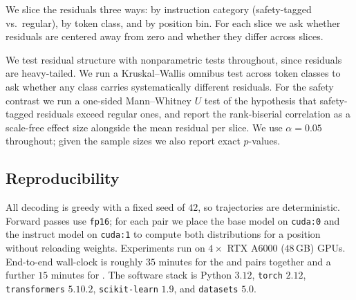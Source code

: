  We slice the residuals three ways: by instruction category (safety-tagged vs.\ regular), by token class, and by position bin. For each slice we ask whether residuals are centered away from zero and whether they differ across slices.

 We test residual structure with nonparametric tests throughout, since residuals are heavy-tailed. We run a Kruskal--Wallis omnibus test across token classes to ask whether any class carries systematically different residuals. For the safety contrast we run a one-sided Mann--Whitney $U$ test of the hypothesis that safety-tagged residuals exceed regular ones, and report the rank-biserial correlation as a scale-free effect size alongside the mean residual per slice. We use $\alpha=0.05$ throughout; given the sample sizes we also report exact $p$-values.

\subsection{Reproducibility}\label{ssec:repro}

All decoding is greedy with a fixed seed of $42$, so trajectories are deterministic. Forward passes use \texttt{fp16}; for each pair we place the base model on \texttt{cuda:0} and the instruct model on \texttt{cuda:1} to compute both distributions for a position without reloading weights. Experiments run on $4\times$ RTX A6000 ($48$\,GB) GPUs. End-to-end wall-clock is roughly $35$ minutes for the \qwensmall and \qwenmid pairs together and a further $15$ minutes for \qwenbig. The software stack is Python $3.12$, \texttt{torch} $2.12$, \texttt{transformers} $5.10.2$, \texttt{scikit-learn} $1.9$, and \texttt{datasets} $5.0$.
